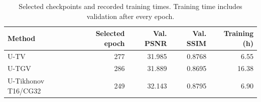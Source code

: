 \begin{table}[htbp]
\centering
\caption{Selected checkpoints and recorded training times. Training time includes validation after every epoch.}
\label{tab:checkpoint_selection}
\begin{tabular}{lrrrr}
\toprule
Method & Selected epoch & Val. PSNR & Val. SSIM & Training (h) \\
\midrule
U-TV & 277 & 31.985 & 0.8768 & 6.55 \\
U-TGV & 286 & 31.889 & 0.8695 & 16.38 \\
U-Tikhonov T16/CG32 & 249 & 32.143 & 0.8795 & 6.90 \\
\bottomrule
\end{tabular}
\end{table}
